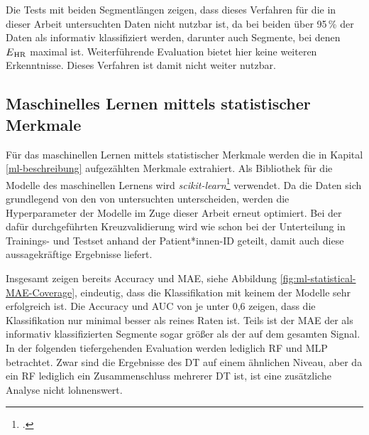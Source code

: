 Die Tests mit beiden Segmentlängen zeigen, dass dieses Verfahren für die in dieser Arbeit untersuchten Daten nicht nutzbar ist, da bei beiden über 95\,\% der Daten als informativ klassifiziert werden, darunter auch Segmente, bei denen $E\textsubscript{HR}$ maximal ist. Weiterführende Evaluation bietet hier keine weiteren Erkenntnisse. Dieses Verfahren ist damit nicht weiter nutzbar.

\subsection{Maschinelles Lernen mittels statistischer Merkmale}\label{res-statistical}

Für das maschinellen Lernen mittels statistischer Merkmale werden die in Kapital \ref{ml-beschreibung} aufgezählten Merkmale extrahiert. Als Bibliothek für die Modelle des maschinellen Lernens wird \textit{scikit-learn}\footcite[]{scikit-learn} verwendet. Da die Daten sich grundlegend von den von \citeauthor{Sadek2016} untersuchten unterscheiden, werden die Hyperparameter der Modelle im Zuge dieser Arbeit erneut optimiert. Bei der dafür durchgeführten Kreuzvalidierung wird wie schon bei der Unterteilung in Trainings- und Testset anhand der Patient*innen-ID geteilt, damit auch diese aussagekräftige Ergebnisse liefert.

Insgesamt zeigen bereits Accuracy und \ac{MAE}, siehe Abbildung \ref{fig:ml-statistical-MAE-Coverage}, eindeutig, dass die Klassifikation mit keinem der Modelle sehr erfolgreich ist. Die Accuracy und AUC von je unter 0,6 zeigen, dass die Klassifikation nur minimal besser als reines Raten ist. Teils ist der \ac{MAE} der als informativ klassifizierten Segmente sogar größer als der auf dem gesamten Signal. In der folgenden tiefergehenden Evaluation werden lediglich \ac{RF} und \ac{MLP} betrachtet. Zwar sind die Ergebnisse des \ac{DT} auf einem ähnlichen Niveau, aber da ein \ac{RF} lediglich ein Zusammenschluss mehrerer \ac{DT} ist, ist eine zusätzliche Analyse nicht lohnenswert. 


